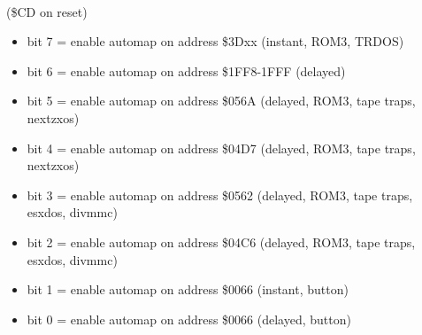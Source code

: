 \\
(\$CD on reset)
\begin{itemize}
\item bit 7 = enable automap on address \$3Dxx (instant, ROM3, TRDOS)
\item bit 6 = enable automap on address \$1FF8-1FFF (delayed)
\item bit 5 = enable automap on address \$056A (delayed, ROM3, tape traps, nextzxos)
\item bit 4 = enable automap on address \$04D7 (delayed, ROM3, tape traps, nextzxos)
\item bit 3 = enable automap on address \$0562 (delayed, ROM3, tape traps, esxdos, divmmc)
\item bit 2 = enable automap on address \$04C6 (delayed, ROM3, tape traps, esxdos, divmmc)
\item bit 1 = enable automap on address \$0066 (instant, button)
\item bit 0 = enable automap on address \$0066 (delayed, button)
\end{itemize}

